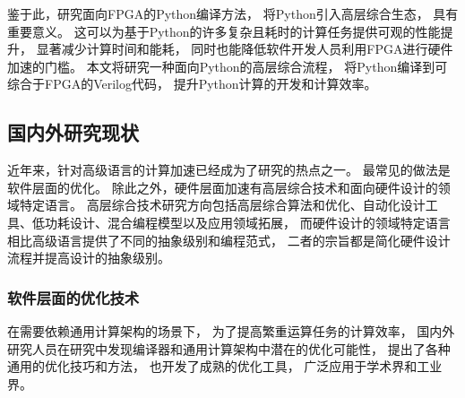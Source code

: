 鉴于此，研究面向FPGA的Python编译方法，
将Python引入高层综合生态，
具有重要意义。
这可以为基于Python的许多复杂且耗时的计算任务提供可观的性能提升，
显著减少计算时间和能耗，
同时也能降低软件开发人员利用FPGA进行硬件加速的门槛。
本文将研究一种面向Python的高层综合流程，
将Python编译到可综合于FPGA的Verilog代码，
提升Python计算的开发和计算效率。

% 

\subsection{国内外研究现状}


近年来，针对高级语言的计算加速已经成为了研究的热点之一。
最常见的做法是软件层面的优化。
除此之外，硬件层面加速有高层综合技术和面向硬件设计的领域特定语言。
高层综合技术研究方向包括高层综合算法和优化、自动化设计工具、低功耗设计、混合编程模型以及应用领域拓展，
而硬件设计的领域特定语言相比高级语言提供了不同的抽象级别和编程范式，
二者的宗旨都是简化硬件设计流程并提高设计的抽象级别。

\subsubsection{软件层面的优化技术}

在需要依赖通用计算架构的场景下，
为了提高繁重运算任务的计算效率，
国内外研究人员在研究中发现编译器和通用计算架构中潜在的优化可能性，
提出了各种通用的优化技巧和方法，
也开发了成熟的优化工具，
广泛应用于学术界和工业界。

